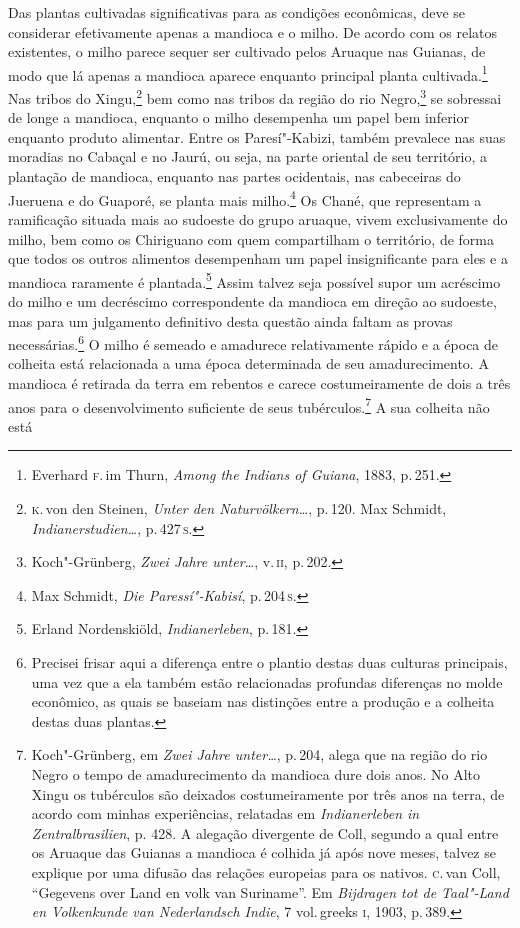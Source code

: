 Das plantas cultivadas significativas para as condições econômicas, deve
se considerar efetivamente apenas a mandioca e o milho. De acordo com
os relatos existentes, o milho parece sequer ser cultivado pelos Aruaque
nas Guianas, de modo que lá apenas a mandioca aparece enquanto principal
planta cultivada.\footnote{Everhard \textsc{f}.\,im Thurn, \textit{Among the Indians
  of Guiana}, 1883, p.\,251.} Nas tribos do Xingu,\footnote{\textsc{k}.\,von den
  Steinen, \textit{Unter den Naturvölkern\ldots}, p.\,120. Max
  Schmidt, \textit{Indianerstudien\ldots}, p.\,427\,\textsc{s}.} bem
como nas tribos da região do rio Negro,\footnote{Koch"-Grünberg,
  \textit{Zwei Jahre unter\ldots}, v.\,\textsc{ii}, p.\,202.} se sobressai
de longe a mandioca, enquanto o milho desempenha um papel bem inferior
enquanto produto alimentar. Entre os Paresí"-Kabizi, também prevalece nas
suas moradias no Cabaçal e no Jaurú, ou seja, na parte oriental de seu
território, a plantação de mandioca, enquanto nas partes ocidentais, nas
cabeceiras do Jueruena e do Guaporé, se planta mais milho.\footnote{Max
  Schmidt, \textit{Die Paressí"-Kabisí}, p.\,204\,\textsc{s}.} Os Chané, que
representam a ramificação situada mais ao sudoeste do grupo aruaque,
vivem exclusivamente do milho, bem como os Chiriguano com quem compartilham 
o território, de forma que todos os outros alimentos
desempenham um papel insignificante para eles e a mandioca raramente é
plantada.\footnote{Erland Nordenskiöld, \textit{Indianerleben}, p.\,181.} Assim talvez seja possível supor um
acréscimo do milho e um decréscimo correspondente da mandioca em direção
ao sudoeste, mas para um julgamento definitivo desta questão ainda
faltam as provas necessárias.\footnote{Precisei frisar aqui a diferença entre o
plantio destas duas culturas principais, uma vez que a ela também estão
relacionadas profundas diferenças no molde econômico, as quais se
baseiam nas distinções entre a produção e a colheita destas duas
plantas.} O milho é semeado e amadurece relativamente rápido e a época de
colheita está relacionada a uma época determinada de seu amadurecimento.
A mandioca é retirada da terra em rebentos e carece costumeiramente de
dois a três anos para o desenvolvimento suficiente de seus
tubérculos.\footnote{Koch"-Grünberg, em \textit{Zwei Jahre unter\ldots}, p.\,204, alega que na região do rio Negro o tempo de
  amadurecimento da mandioca dure dois anos. No Alto Xingu os tubérculos
  são deixados costumeiramente por três anos na terra, de acordo com
  minhas experiências, relatadas em \textit{Indianerleben in Zentralbrasilien}, p.
  428. A alegação divergente de Coll, segundo a qual entre os Aruaque
  das Guianas a mandioca é colhida já após nove meses, talvez se
  explique por uma difusão das relações europeias para os nativos. \textsc{c}.\,van Coll, ``Gegevens over Land en volk van Suriname''. Em
  \textit{Bijdragen tot de Taal"-Land en Volkenkunde van Nederlandsch
  Indie}, 7 vol.\,greeks \textsc{i}, 1903, p.\,389.} A sua colheita não está
